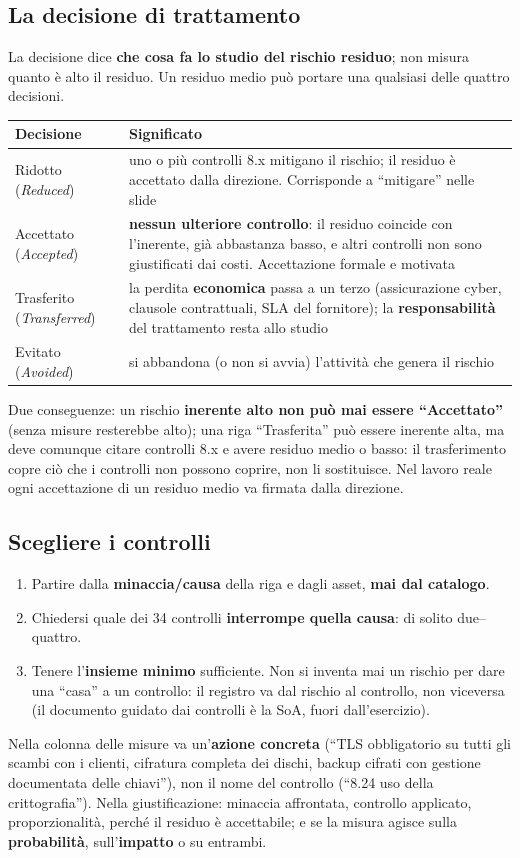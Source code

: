 \subsection{La decisione di trattamento}
La decisione dice \textbf{che cosa fa lo studio del rischio residuo}; non misura quanto è alto il
residuo. Un residuo medio può portare una qualsiasi delle quattro decisioni.
\begin{center}
\small
\begin{tabularx}{\linewidth}{l X}
\toprule
\textbf{Decisione} & \textbf{Significato} \\ \midrule
Ridotto (\emph{Reduced}) & uno o più controlli 8.x mitigano il rischio; il residuo è accettato dalla
  direzione. Corrisponde a ``mitigare'' nelle slide \\
Accettato (\emph{Accepted}) & \textbf{nessun ulteriore controllo}: il residuo coincide con l'inerente,
  già abbastanza basso, e altri controlli non sono giustificati dai costi. Accettazione formale e motivata \\
Trasferito (\emph{Transferred}) & la perdita \textbf{economica} passa a un terzo (assicurazione cyber,
  clausole contrattuali, SLA del fornitore); la \textbf{responsabilità} del trattamento resta allo studio \\
Evitato (\emph{Avoided}) & si abbandona (o non si avvia) l'attività che genera il rischio \\ \bottomrule
\end{tabularx}
\end{center}
Due conseguenze: un rischio \textbf{inerente alto non può mai essere ``Accettato''} (senza misure resterebbe
alto); una riga ``Trasferita'' può essere inerente alta, ma deve comunque citare controlli 8.x e avere
residuo medio o basso: il trasferimento copre ciò che i controlli non possono coprire, non li sostituisce.
Nel lavoro reale ogni accettazione di un residuo medio va firmata dalla direzione.

\subsection{Scegliere i controlli}
\begin{enumerate}
  \item Partire dalla \textbf{minaccia/causa} della riga e dagli asset, \textbf{mai dal catalogo}.
  \item Chiedersi quale dei 34 controlli \textbf{interrompe quella causa}: di solito due--quattro.
  \item Tenere l'\textbf{insieme minimo} sufficiente. Non si inventa mai un rischio per dare una ``casa''
    a un controllo: il registro va dal rischio al controllo, non viceversa (il documento guidato dai
    controlli è la SoA, fuori dall'esercizio).
\end{enumerate}
Nella colonna delle misure va un'\textbf{azione concreta} (``TLS obbligatorio su tutti gli scambi con i
clienti, cifratura completa dei dischi, backup cifrati con gestione documentata delle chiavi''), non il
nome del controllo (``8.24 uso della crittografia''). Nella giustificazione: minaccia affrontata,
controllo applicato, proporzionalità, perché il residuo è accettabile; e se la misura agisce sulla
\textbf{probabilità}, sull'\textbf{impatto} o su entrambi.

